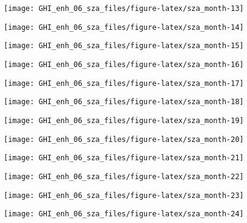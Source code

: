 \documentclass[
  10pt,
  a4paper,oneside]{article}
\begin{document}
\begin{center}\texttt{[image: GHI\_enh\_06\_sza\_files/figure-latex/sza\_month-13]} \end{center}

\begin{center}\texttt{[image: GHI\_enh\_06\_sza\_files/figure-latex/sza\_month-14]} \end{center}

\begin{center}\texttt{[image: GHI\_enh\_06\_sza\_files/figure-latex/sza\_month-15]} \end{center}

\begin{center}\texttt{[image: GHI\_enh\_06\_sza\_files/figure-latex/sza\_month-16]} \end{center}

\begin{center}\texttt{[image: GHI\_enh\_06\_sza\_files/figure-latex/sza\_month-17]} \end{center}

\begin{center}\texttt{[image: GHI\_enh\_06\_sza\_files/figure-latex/sza\_month-18]} \end{center}

\begin{center}\texttt{[image: GHI\_enh\_06\_sza\_files/figure-latex/sza\_month-19]} \end{center}

\begin{center}\texttt{[image: GHI\_enh\_06\_sza\_files/figure-latex/sza\_month-20]} \end{center}

\begin{center}\texttt{[image: GHI\_enh\_06\_sza\_files/figure-latex/sza\_month-21]} \end{center}

\begin{center}\texttt{[image: GHI\_enh\_06\_sza\_files/figure-latex/sza\_month-22]} \end{center}

\begin{center}\texttt{[image: GHI\_enh\_06\_sza\_files/figure-latex/sza\_month-23]} \end{center}

\begin{center}\texttt{[image: GHI\_enh\_06\_sza\_files/figure-latex/sza\_month-24]} \end{center}
\end{document}

